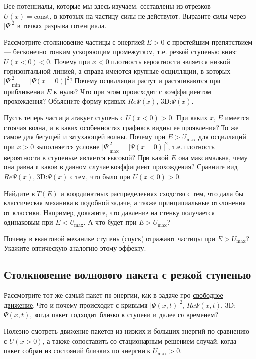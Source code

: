 \documentclass[12pt]{article}
\begin{document}
Все потенциалы, которые мы здесь изучаем, составлены из отрезков $U(x)=\textrm{const}$, в которых на частицу силы не действуют. Выразите силы через $|\Psi|^2$ в точках разрыва потенциала.

Рассмотрите столкновение частицы с энергией $E>0$ с простейшим препятствием --- бесконечно тонким ускоряющим промежутком, т.е. резкой ступенью вниз: $U(x<0)<0$. Почему при $x<0$ плотность вероятности является низкой горизонтальной линией, а справа имеются крупные осцилляции, в которых $|\Psi|^2_{\min}=|\Psi(x=0)|^2$? Почему осцилляции растут и растягиваются при приближении $E$ к нулю? Что при этом происходит с коэффициентом прохождения? Объясните форму кривых $Re\Psi(x)$, 3D:$\Psi(x)$.

Пусть теперь частица атакует %
ступень с $U(x<0)>0$. При каких $x$, $E$ имеется стоячая волна, и в каких особенностях графиков видны ее проявления? То же самое для бегущей и затухающей волны.
Почему при $E>U_{\max}$ для осцилляций при $x>0$ выполняется условие $|\Psi|^2_{\max}=|\Psi(x=0)|^2$, т.е. плотность вероятности в ступеньке является высокой? При
какой $E$ она максимальна,
чему она равна и каков в данном случае коэффициент прохождения?
Сравните вид $Re\Psi(x)$, 3D:$\Psi(x)$ с тем, что было
при $U(x<0)>0$.

Найдите в $T(E)$ и координатных распределениях сходство с тем,
что дала бы классическая механика в подобной задаче, а также
принципиальные отклонения от классики. Например, докажите, что
давление на стенку получается одинаковым при $E<U_{\max}$. А что будет при $E>U_{\max}$?

Почему в квантовой
механике ступень (спуск) отражают частицы при $E>U_{\max}$? Укажите оптическую аналогию этому эффекту.



\hypertarget{WP_step}{}\subsection{Столкновение волнового пакета
с резкой ступенью}
Рассмотрите тот же самый пакет по энергии, как в задаче про \hyperlink{WP}{свободное движение}. Что и почему  происходит с
кривыми $|\Psi (x,t)|^2$, $Re \Psi (x,t)$, 3D:$\Psi(x,t)$, когда пакет подходит близко к ступени и далее со
временем?

Полезно смотреть движение пакетов из низких и больших энергий по сравнению с $U(x>0)$, а также  сопоставить со стационарным решением случай, когда пакет собран из состояний близких по энергии к $U_{\max}>0$.
\end{document}
